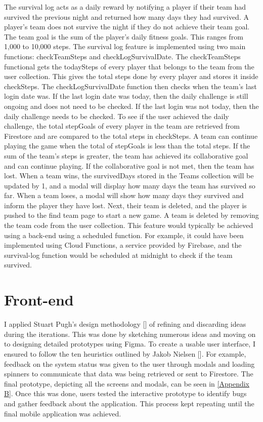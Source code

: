 \documentclass{l4proj}
\begin{document}
The survival log acts as a daily reward by notifying a player if their team had survived the previous night and returned how many days they had survived. A player's team does not survive the night if they do not achieve their team goal. The team goal is the sum of the player's daily fitness goals. This ranges from 1,000 to 10,000 steps. The survival log feature is implemented using two main functions: checkTeamSteps and checkLogSurvivalDate.
The checkTeamSteps functional gets the todaySteps of every player that belongs to the team from the user collection. This gives the total steps done by every player and stores it inside checkSteps. The checkLogSurvivalDate function then checks when the team's last login date was. If the last login date was today, then the daily challenge is still ongoing and does not need to be checked. If the last login was not today, then the daily challenge needs to be checked. 
To see if the user achieved the daily challenge, the total stepGoals of every player in the team are retrieved from Firestore and are compared to the total steps in checkSteps. A team can continue playing the game when the total of stepGoals is less than the total steps. If the sum of the team's steps is greater, the team has achieved its collaborative goal and can continue playing. If the collaborative goal is not met, then the team has lost.
When a team wins, the survivedDays stored in the Teams collection will be updated by 1, and a modal will display how many days the team has survived so far. When a team loses, a modal will show how many days they survived and inform the player they have lost. Next, their team is deleted, and the player is pushed to the find team page to start a new game. A team is deleted by removing the team code from the user collection. 
This feature would typically be achieved using a back-end using a scheduled function. For example, it could have been implemented using Cloud Functions, a service provided by Firebase, and the survival-log function would be scheduled at midnight to check if the team survived. 


\section{Front-end}
I applied Stuart Pugh’s design methodology [] of refining and discarding ideas during the iterations. This was done by sketching numerous ideas and moving on to designing detailed prototypes using Figma. To create a usable user interface, I ensured to follow the ten heuristics outlined by Jakob Nielsen []. For example, feedback on the system status was given to the user through modals and loading spinners to communicate that data was being retrieved or sent to Firestore. The final prototype, depicting all the screens and modals, can be seen in \ref{Appendix B}. Once this was done, users tested the interactive prototype to identify bugs and gather feedback about the application. This process kept repeating until the final mobile application was achieved. 
\end{document}
